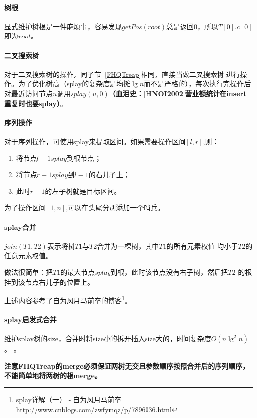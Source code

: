 \paragraph{树根}

显式维护树根是一件麻烦事，容易发现$getPos(root)$总是返回0，所以$T[0].c[0]$
即为$root$。

\paragraph{二叉搜索树}

对于二叉搜索树的操作，同子节~\ref{FHQTreap}相同，直接当做二叉搜索树
进行操作。为了优化树高（splay的复杂度是均摊$\lg n$而不是严格的），每次执行完操作后
对最近访问节点$u$调用$splay(u,0)${\bfseries（血泪史：[HNOI2002]营业额统计在insert
重复时也要splay）}。

\paragraph{序列操作}

对于序列操作，可使用splay来提取区间。如果需要操作区间$[l,r]$,则：

\begin{enumerate}
	\item 将节点$l-1 splay$到根节点；
	\item 将节点$r+1 splay$到$l-1$的右儿子上；
	\item 此时$r+1$的左子树就是目标区间。
\end{enumerate}

为了操作区间$[1,n]$,可以在头尾分别添加一个哨兵。

\paragraph{splay合并}

$join(T1,T2)$表示将树$T1$与$T2$合并为一棵树，其中$T1$的所有元素权值
均小于$T2$的任意元素权值。

做法很简单：把$T1$的最大节点$splay$到根，此时该节点没有右子树，然后把$T2$
的根挂到该节点右儿子的位置上。

上述内容参考了自为风月马前卒的博客\footnote{splay详解（一） - 自为风月马前卒
	\url{http://www.cnblogs.com/zwfymqz/p/7896036.html}}。

\paragraph{splay启发式合并}
维护splay树的size，合并时将size小的拆开插入size大的，时间复杂度$O(n\lg^2n)$。
。

{\bfseries 注意FHQTreap的merge必须保证两树无交且参数顺序按照合并后的序列顺序，
不能简单地将两树的根merge。}
